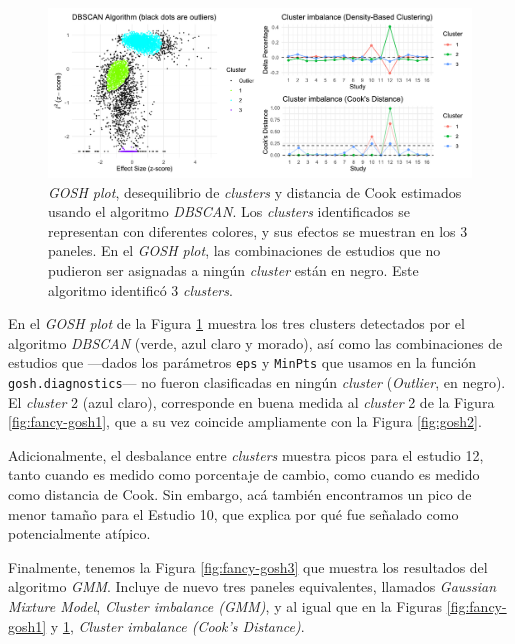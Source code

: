 \documentclass[
  bookmarksnumbered]{article}
\begin{document}
\begin{figure}

{\centering \includegraphics[height=170px]{images/fancy_gosh_P2} 

}

\caption{\textit{GOSH plot}, desequilibrio de \textit{clusters} y distancia de Cook estimados usando el algoritmo \textit{DBSCAN}. Los \textit{clusters} identificados se representan con diferentes colores, y sus efectos se muestran en los 3 paneles. En el \textit{GOSH plot}, las combinaciones de estudios que no pudieron ser asignadas a ningún \textit{cluster} están en negro. Este algoritmo identificó 3 \textit{clusters}.}\label{fig:fancy-gosh2}
\end{figure}

En el \emph{GOSH plot} de la Figura \ref{fig:fancy-gosh2} muestra los tres clusters detectados por el algoritmo \emph{DBSCAN} (verde, azul claro y morado), así como las combinaciones de estudios que ---dados los parámetros \texttt{eps} y \texttt{MinPts} que usamos en la función \texttt{gosh.diagnostics}--- no fueron clasificadas en ningún \emph{cluster} (\emph{Outlier}, en negro). El \emph{cluster} 2 (azul claro), corresponde en buena medida al \emph{cluster} 2 de la Figura \ref{fig:fancy-gosh1}, que a su vez coincide ampliamente con la Figura \ref{fig:gosh2}.

Adicionalmente, el desbalance entre \emph{clusters} muestra picos para el estudio 12, tanto cuando es medido como porcentaje de cambio, como cuando es medido como distancia de Cook. Sin embargo, acá también encontramos un pico de menor tamaño para el Estudio 10, que explica por qué fue señalado como potencialmente atípico.

Finalmente, tenemos la Figura \ref{fig:fancy-gosh3} que muestra los resultados del algoritmo \emph{GMM}. Incluye de nuevo tres paneles equivalentes, llamados \emph{Gaussian Mixture Model}, \emph{Cluster imbalance (GMM)}, y al igual que en la Figuras \ref{fig:fancy-gosh1} y \ref{fig:fancy-gosh2}, \emph{Cluster imbalance (Cook's Distance)}.
\end{document}
